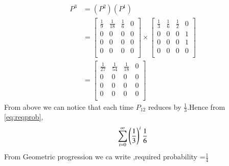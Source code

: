 \documentclass[journal,12pt,twocolumn]{IEEEtran}
\begin{document}
\begin{align}
    P^3&=(P^2)(P^1)\\
    &=\begin{bmatrix}
\frac{1}{9}&\frac{1}{18}&\frac{1}{6}&0\\
0&0&0&0\\
0&0&0&0\\
0&0&0&0\\
\end{bmatrix}\times
\begin{bmatrix}
\frac{1}{3}&\frac{1}{6}&\frac{1}{2}&0\\
0&0&0&1\\
0&0&0&1\\
0&0&0&0\\
\end{bmatrix}\\
&=\begin{bmatrix}
\frac{1}{27}&\frac{1}{54}&\frac{1}{18}&0\\
0&0&0&0\\
0&0&0&0\\
0&0&0&0\\
\end{bmatrix}
\end{align}
From above we can notice that each time $P_{12}$ reduces by $\frac{1}{3}$.Hence from \eqref{eq:reqprob},
\begin{equation}
    \sum_{i=0}^{\infty}\left(\frac{1}{3}\right)^i \frac{1}{6}
\end{equation}
From Geometric progression we ca write ,required probability =$\frac{1}{4}$
\end{document}
